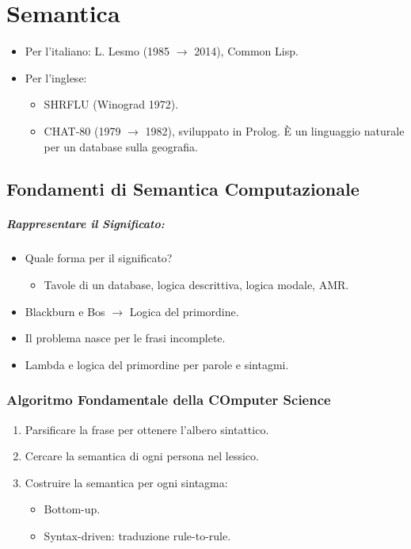 \chapter{Semantica}



\begin{itemize}
  \item Per l'italiano: L. Lesmo (1985 $\rightarrow$ 2014), Common Lisp.
  \item Per l'inglese: 
    \begin{itemize}
      \item SHRFLU (Winograd 1972). 
      \item CHAT-80 (1979 $\rightarrow$ 1982), sviluppato in Prolog. È un linguaggio naturale per un database sulla geografia.
    \end{itemize}
\end{itemize}

\section{Fondamenti di Semantica Computazionale}


\paragraph{Rappresentare il Significato:}

\begin{itemize}
  \item Quale forma per il significato?
    \begin{itemize}
      \item Tavole di un database, logica descrittiva, logica modale, AMR. 
    \end{itemize}
  \item Blackburn e Bos $\rightarrow$ Logica del primordine. 
  \item Il problema nasce per le frasi incomplete. 
  \item Lambda e logica del primordine per parole e sintagmi.
\end{itemize}

\subsection{Algoritmo Fondamentale della COmputer Science}

\begin{enumerate}
  \item Parsificare la frase per ottenere l'albero sintattico. 
  \item Cercare la semantica di ogni persona nel lessico. 
  \item Costruire la semantica per ogni sintagma:
    \begin{itemize}
      \item Bottom-up. 
      \item Syntax-driven: traduzione rule-to-rule.
    \end{itemize}
\end{enumerate}

